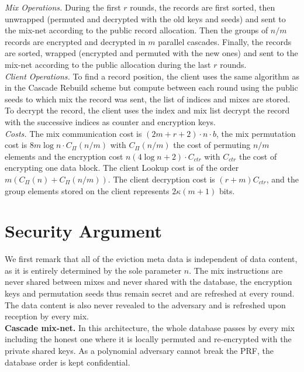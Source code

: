 \documentclass{llncs}
\begin{document}
\vspace{-1em}

\noindent\textit{Mix Operations.} During the first $r$ rounds, the records are first sorted, then  unwrapped (permuted and decrypted with the old keys and seeds) and sent to the mix-net according to the public record allocation. Then the groups of $n/m$ records are encrypted and decrypted in $m$ parallel cascades. Finally, the records are sorted, wrapped (encrypted and permuted with the new ones) and sent to the mix-net according to the public allocation during the last $r$ rounds.\\

\noindent\textit{Client Operations.} To find a record position, the client uses the same algorithm as in the Cascade Rebuild scheme but compute between each round using the public seeds to which mix the record was sent, the list of indices and mixes are stored. To decrypt the record, the client uses the index and mix list decrypt the record with the successive indices as counter and encryption keys.\\

\noindent\textit{Costs.} The mix communication cost is $ (2m+r+2) \cdot n \cdot b$, the mix permutation cost is $8m \log n \cdot C_{\Pi}(n/m)$ with $C_{\Pi}(n/m)$ the cost of permuting $n/m$ elements and the encryption cost $n (4 \log n +2) \cdot C_{ctr}$ with $C_{ctr}$ the cost of encrypting one data block. The client Lookup cost is of the order $m (C_{\Pi}(n)+C_{\Pi}(n/m))$. The client decryption cost is $(r+m) C_{ctr}$, and the group elements stored on the client represents $2\kappa (m+1)$ bits.

\section{Security Argument}\label{Security}

We first remark that all of the eviction meta data is independent of data content, as it is entirely determined by the sole parameter $n$. The mix instructions are never shared between mixes and never shared with the database, the encryption keys and permutation seeds thus remain secret and are refreshed at every round. The data content is also never revealed to the adversary and is refreshed upon reception by every mix.\\

\noindent\textbf{Cascade mix-net.}
In this architecture, the whole database passes by every mix including the honest one where it is locally permuted and re-encrypted with the private shared keys. As a polynomial adversary cannot break the PRF, the database order is kept confidential.\\
\end{document}
